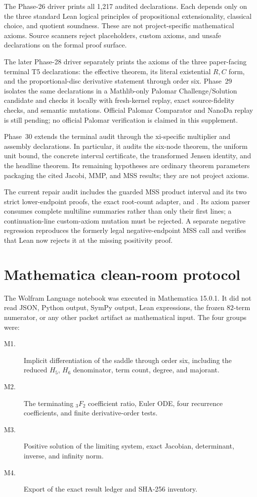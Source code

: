 \documentclass[10pt]{article}
\begin{document}
The Phase-26 driver  prints all 1,217 audited
declarations.  Each
depends only on the three standard Lean logical principles of propositional
extensionality, classical choice, and quotient soundness.  These are not
project-specific mathematical axioms.  Source scanners reject placeholders,
custom axioms, and unsafe declarations on the formal proof surface.

The later Phase-28 driver separately prints the axioms of the three
paper-facing terminal T5 declarations: the effective theorem, its literal
existential $R,C$ form, and the proportional-disc derivative statement
through order six.  Phase~29 isolates the same declarations in a
Mathlib-only Palomar Challenge/Solution candidate and checks it locally with
fresh-kernel replay, exact source-fidelity checks, and semantic mutations.
Official Palomar Comparator and NanoDa replay is still pending; no official
Palomar verification is claimed in this supplement.

Phase~30 extends the terminal audit through the xi-specific multiplier and
assembly declarations.  In particular, it audits the six-node theorem, the
uniform unit bound, the concrete interval certificate, the transformed
Jensen identity, and the headline theorem.  Its remaining hypotheses are
ordinary theorem parameters packaging the cited Jacobi, MMP, and MSS
results; they are not project axioms.

The current repair audit includes the guarded MSS product interval and its
two strict lower-endpoint proofs, the exact root-count adapter, and
.  Its axiom
parser consumes complete multiline summaries rather than only their first
lines; a continuation-line custom-axiom mutation must be rejected.  A
separate negative regression reproduces the formerly legal negative-endpoint
MSS call and verifies that Lean now rejects it at the missing positivity
proof.

\section{Mathematica clean-room protocol}\label{sup:mathematica}

The Wolfram Language notebook was executed in Mathematica 15.0.1.  It did not
read JSON, Python output, SymPy output, Lean expressions, the frozen
$82$-term numerator, or any other packet artifact as mathematical input.
The four groups were:
\begin{description}
\item[M1.] Implicit differentiation of the saddle through order six,
including the reduced $H_5$, $H_6$ denominator, term count, degree, and
majorant.
\item[M2.] The terminating ${}_3F_2$ coefficient ratio, Euler ODE, four
recurrence coefficients, and finite derivative-order tests.
\item[M3.] Positive solution of the limiting system, exact Jacobian,
determinant, inverse, and infinity norm.
\item[M4.] Export of the exact result ledger and SHA-256 inventory.
\end{description}
\end{document}
